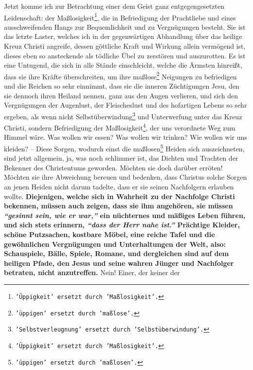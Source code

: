 Jetzt komme ich zur Betrachtung einer dem Geist ganz entgegengesetzten
Leidenschaft: der Maßlosigkeit\footnote{\texttt{'Üppigkeit' ersetzt durch
'Maßlosigkeit'.}}, die in Befriedigung der Prachtliebe und
eines
ausschweifenden Hangs zur
Bequemlichkeit und zu Vergnügungen
besteht. Sie ist
das letzte Laster, welches ich in der gegenwärtigen Abhandlung
über das heilige
Kreuz Christi angreife, dessen göttliche Kraft und Wirkung allein vermögend ist,
dieses eben so ansteckende als tödliche Übel zu
zerstören und auszurotten. Es
ist eine Untugend, die sich in alle Stände einschleicht, welche
die Ärmsten
hinreißt, dass sie ihre Kräfte überschreiten, um ihre
maßlose\footnote{\texttt{'üppigen' ersetzt durch 'maßlose'.}} Neigungen zu
befriedigen und die Reichen so sehr einnimmt, dass sie die inneren Züchtigungen
Jesu, den sie dennoch ihren
Heiland nennen, ganz aus den Augen verlieren, und sich
den Vergnügungen der Augenlust, der
Fleischeslust und des
hofartigen Lebens so
sehr ergeben, als wenn nicht
Selbstüberwindung\footnote{\texttt{'Selbstverleugnung' ersetzt
durch 'Selbstüberwindung'.}}
 und Unterwerfung
unter das Kreuz
Christi, sondern Befriedigung der Maßlosigkeit\footnote{\texttt{'Üppigkeit'
ersetzt durch 'Maßlosigkeit'.}},
der uns verordnete Weg zum Himmel
wäre. Was wollen wir essen? Was wollen wir trinken? Wie wollen wir uns kleiden?
-- Diese Sorgen, wodurch einst die maßlosen\footnote{\texttt{'üppigen' ersetzt
durch 'maßlosen'.}}
Heiden sich auszeichneten, sind jetzt
allgemein, ja, was noch schlimmer ist, das Dichten und Trachten
der Bekenner des
Christentums geworden. Möchten sie doch darüber erröten! Möchten sie ihre
Abweichung bereuen und bedenken, dass Christus solche
Sorgen an jenen Heiden
nicht darum tadelte, dass er sie seinen Nachfolgern erlauben wollte.
\label{ref:14_01_wahre_nachfolger} \textbf{Diejenigen,
welche sich in Wahrheit zu der Nachfolge Christi bekennen, müssen auch zeigen,
dass sie ihm angehören, sie müssen
\textit{"`gesinnt sein, wie er war,"'} ein nüchternes
und mäßiges Leben führen, und sich stets erinnern,
\textit{"`dass der Herr nahe ist."'}
Prächtige Kleider, schöne Putzsachen, kostbare
Möbel,
eine reiche Tafel und die
gewöhnlichen Vergnügungen und
Unterhaltungen der Welt,
also: Schauspiele, Bälle,
Spiele, Romane, und dergleichen sind auf dem
heiligen Pfade,
den Jesus und seine wahren
Jünger und Nachfolger betraten, nicht anzutreffen.} Nein! Einer, der keiner der
